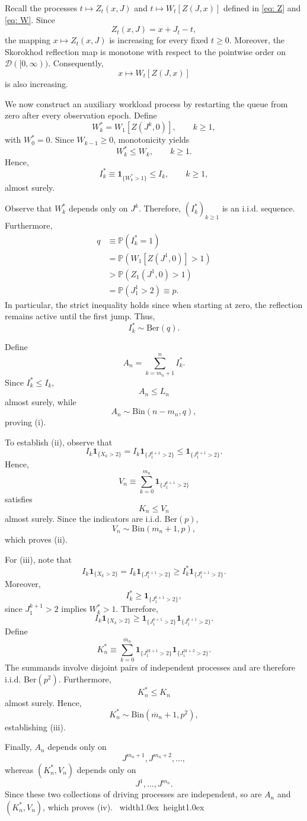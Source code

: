 \documentclass[12pt]{article}
\newcommand{\1}{\mathbf{1}}
\def\endpf{{\ \hfill\hbox{\vrule width1.0ex height1.0ex}\parfillskip 0pt
	}}
\newenvironment{proof}{\noindent{\bf Proof:}}{\endpf}
\begin{document}
\begin{proof}
Recall the processes
$t\mapsto Z_t(x,J)$
and
$t\mapsto W_t[Z(J,x)]$
defined in
\eqref{eq: Z}
and
\eqref{eq: W}.
Since
\[
Z_t(x,J)=x+J_t-t,
\]
the mapping
$x\mapsto Z_t(x,J)$
is increasing for every fixed $t\ge0$.
Moreover, the Skorokhod reflection map is monotone with respect to the pointwise order on
$\mathcal D([0,\infty))$.
Consequently,
\[
x\longmapsto W_t[Z(J,x)]
\]
is also increasing.

We now construct an auxiliary workload process by restarting the queue from zero after every observation epoch. Define
\[
W_k^*
=
W_1[Z(J^k,0)],
\qquad
k\ge1,
\]
with $W_0^*=0$.
Since $W_{k-1}\ge0$, monotonicity yields
\[
W_k^*\le W_k,
\qquad
k\ge1.
\]
Hence,
\[
I_k^*
\equiv
\mathbf1_{\{W_k^*>1\}}
\le
I_k,
\qquad
k\ge1,
\]
almost surely.

Observe that $W_k^*$ depends only on $J^k$.
Therefore,
$(I_k^*)_{k\ge1}$
is an i.i.d. sequence.
Furthermore,
\begin{align*}
q
&\equiv
\mathbb P(I_k^*=1)
\\
&=
\mathbb P\!\left(
W_1[Z(J^1,0)]>1
\right)
\\
&>
\mathbb P\!\left(
Z_1(J^1,0)>1
\right)
\\
&=
\mathbb P(J_1^1>2)
\equiv
p.
\end{align*}
In particular, the strict inequality holds since when starting at zero, the reflection remains active until the first jump.
Thus,
\[
I_k^*\sim\mathrm{Ber}(q).
\]

Define
\[
A_n
=
\sum_{k=m_n+1}^{n}I_k^*.
\]
Since $I_k^*\le I_k$,
\[
A_n\le L_n
\]
almost surely, while
\[
A_n\sim\mathrm{Bin}(n-m_n,q),
\]
proving (i).

To establish (ii), observe that
\[
I_k\mathbf1_{\{X_k>2\}}
=
I_k\mathbf1_{\{J^{k+1}_1>2\}}
\le
\mathbf1_{\{J^{k+1}_1>2\}}.
\]
Hence,
\[
V_n\equiv\sum_{k=0}^{m_n}
\mathbf1_{\{J^{k+1}_1>2\}}
\]
satisfies
\[
K_n\le V_n
\]
almost surely.
Since the indicators are i.i.d. Ber$(p)$,
\[
V_n\sim\mathrm{Bin}(m_n+1,p),
\]
which proves (ii).

For (iii), note that
\[
I_k
\mathbf1_{\{X_k>2\}}
=
I_k
\mathbf1_{\{J^{k+1}_1>2\}}
\ge
I_k^*
\mathbf1_{\{J^{k+1}_1>2\}}.
\]
Moreover,
\[
I_k^*
\geq
\mathbf1_{\{J^{k+1}_1>2\}}
,
\]
since
$J^{k+1}_1>2$
implies
$W_k^*>1$.
Therefore,
\[
I_k
\mathbf1_{\{X_k>2\}}
\ge
\mathbf1_{\{J^{k+1}_1>2\}}
\mathbf1_{\{J^{k+1}_1>2\}}.
\]
Define
\[
K_n^*\equiv
\sum_{k=0}^{\overline m_n}
\mathbf1_{\{J^{2k+1}_1>2\}}
\mathbf1_{\{J^{2k+2}_1>2\}}.
\]
The summands involve disjoint pairs of independent processes and are therefore i.i.d. Ber$(p^2)$.
Furthermore,
\[
K_n^*
\le
K_n
\]
almost surely.
Hence,
\[
K_n^*
\sim
\mathrm{Bin}(\overline m_n+1,p^2),
\]
establishing (iii).

Finally,
$A_n$
depends only on
\[
J^{m_n+1},
J^{m_n+2},
\ldots,
\]
whereas
$(K_n^*,V_n)$
depends only on
\[
J^1,\ldots,J^{m_n}.
\]
Since these two collections of driving processes are independent, so are
$A_n$
and
$(K_n^*,V_n)$,
which proves (iv).
\end{proof}
\end{document}
